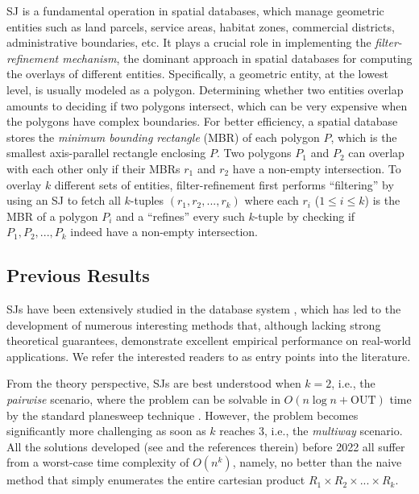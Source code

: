 \documentclass[sigconf]{acmart}
\def\vgap{\vspace{0mm}}
\def\extraspacing{\vspace{1mm} \noindent}
\def\out{\mathrm{OUT}}
\begin{document}
\vgap

SJ is a fundamental operation in spatial databases, which manage geometric entities such as land parcels, service areas, habitat zones, commercial districts, administrative boundaries, etc. It plays a crucial role in implementing the {\em filter-refinement mechanism}, the dominant approach in spatial databases for computing the overlays of different entities. Specifically, a geometric entity, at the lowest level, is usually modeled as a polygon. Determining whether two entities overlap amounts to deciding if two polygons intersect, which can be very expensive when the polygons have complex boundaries. For better efficiency, a spatial database stores the {\em minimum bounding rectangle} (MBR) of each polygon $P$, which is the smallest axis-parallel rectangle enclosing $P$. Two polygons $P_1$ and $P_2$ can overlap with each other only if their MBRs $r_1$ and $r_2$ have a non-empty intersection. To overlay $k$ different sets of entities, filter-refinement first performs ``filtering'' by using an SJ to fetch all $k$-tuples $(r_1, r_2, ..., r_k)$ where each $r_i$ ($1 \le i \le k$) is the MBR of a polygon $P_i$ and a ``refines'' every such $k$-tuple by checking if $P_1, P_2, ..., P_k$ indeed have a non-empty intersection.

\extraspacing {\bf Math Conventions.}

\subsection{Previous Results} \label{sec:intro:prev}

SJs have been extensively studied in the database system , which has led to the development of numerous interesting methods that, although lacking strong theoretical guarantees, demonstrate excellent empirical performance on real-world applications. We refer the interested readers to \cite{apr+00,mp01,???} as entry points into the literature.

\vgap

From the theory perspective, SJs are best understood when $k = 2$, i.e., the {\em pairwise} scenario, where the problem can be solvable in $O(n \log n + \out)$ time by the standard planesweep technique \cite{bcko08}. However, the problem becomes significantly more challenging as soon as $k$ reaches 3, i.e., the {\em multiway} scenario. All the solutions developed (see \cite{mp01,???} and the references therein) before 2022 all suffer from a worst-case time complexity of $O(n^k)$, namely, no better than the naive method that simply enumerates the entire cartesian product $R_1 \times R_2 \times ... \times R_k$.
\end{document}
